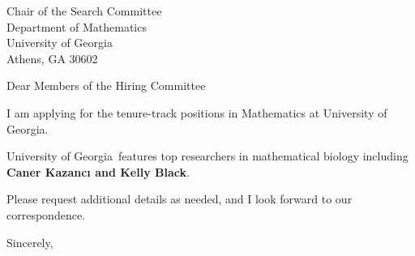 




	
	
	\def\School{University of Georgia}
	
	\begin{letter}
		{Chair of the Search Committee\\
			Department of Mathematics\\
			University of Georgia\\
			Athens, GA 30602
			
		}
		
		\opening{Dear Members of the Hiring Committee}
		
		
		I am applying for the tenure-track positions in Mathematics at \School. 
		
		
		\School~features top researchers in mathematical biology including \textbf{Caner Kazancı and Kelly Black}. 
		
		
		
		
		
		Please request additional details as needed, and I look forward to our correspondence.
		
		\closing{Sincerely,}
	\end{letter}
